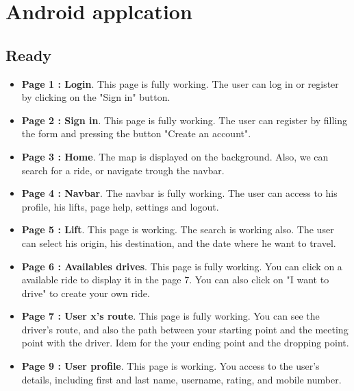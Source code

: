 \chapter{Android applcation}

\section{Ready}

\begin{itemize}
	\item {\bf Page 1 : Login}. This page is fully working. The user can log in or register by clicking on the "Sign in" button.
	\item {\bf Page 2 : Sign in}. This page is fully working. The user can register by filling the form and pressing the button "Create an account".
	\item {\bf Page 3 : Home}. The map is displayed on the background. Also, we can search for a ride, or navigate trough the navbar.
	\item {\bf Page 4 : Navbar}. The navbar is fully working. The user can access to his profile, his lifts, page help, settings and logout.
	\item {\bf Page 5 : Lift}. This page is working. The search is working also. The user can select his origin, his destination, and the date where he want to travel.
	\item {\bf Page 6 : Availables drives}. This page is fully working. You can click on a available ride to display it in the page 7. You can also click on "I want to drive" to create your own ride.
	\item {\bf Page 7 : User x's route}. This page is fully working. You can see the driver's route, and also the path between your starting point and the meeting point with the driver. Idem for the your ending point and the dropping point.
	\item {\bf Page 9 : User profile}. This page is working. You access to the user's details, including first and last name, username, rating, and mobile number.
\end{itemize}

